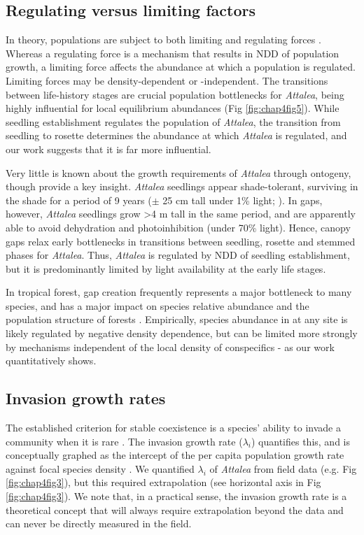 \documentclass[b5paper,justified]{tufte-book} %
\begin{document}
\begin{fullwidth}
\subsection{Regulating versus limiting factors}
In theory, populations are subject to both limiting and regulating forces \citep[e.g.][]{Muller-Landau2016,Turchin1995}. Whereas a regulating force is a mechanism that results in NDD of population growth, a limiting force affects the abundance at which a population is regulated. Limiting forces may be density-dependent or -independent. The transitions between life-history stages are crucial population bottlenecks for \textit{Attalea}, being highly influential for local equilibrium abundances (Fig \ref{fig:chap4fig5}).  While seedling establishment regulates the population of \textit{Attalea}, the transition from seedling to rosette determines the abundance at which \textit{Attalea} is regulated, and our work suggests that it is far more influential.  

Very little is known about the growth requirements of \textit{Attalea} through ontogeny, though \citet{Araus1994} provide a key insight. \textit{Attalea} seedlings appear shade-tolerant, surviving in the shade for a period of 9 years ($\pm$ 25 cm tall under 1\% light; \citealt{Araus1994}). In gaps, however, \textit{Attalea} seedlings grow >4 m tall in the same period, and are apparently able to avoid dehydration and photoinhibition (under 70\% light). Hence, canopy gaps relax early bottlenecks in transitions between seedling, rosette and stemmed phases for \textit{Attalea}.  Thus, \textit{Attalea} is regulated by NDD of seedling establishment, but it is predominantly limited by light availability at the early life stages.
 
In tropical forest, gap creation frequently represents a major bottleneck to many species, and has a major impact on species relative abundance and the population structure of forests \citep{Brokaw1987, Alvarez-Buylla1994, Dalling1998, Farrior2016}.    Empirically, species abundance in at any site is likely regulated by negative density dependence, but can be limited more strongly by mechanisms independent of the local density of conspecifics - as our work quantitatively shows.

\subsection{Invasion growth rates}
The established criterion for stable coexistence is a species' ability to invade a community when it is rare \citep{Adler2010, Siepielski2010}. The invasion growth rate ($\lambda_i$) quantifies this, and is conceptually graphed as the intercept of the per capita population growth rate against focal species density \citep[e.g.][]{Adler2007}.  We quantified $\lambda_i$ of \textit{Attalea} from field data (e.g. Fig \ref{fig:chap4fig3}), but this required extrapolation (see horizontal axis in Fig \ref{fig:chap4fig3}). We note that, in a practical sense, the invasion growth rate is a theoretical concept that will always require extrapolation beyond the data \citep[as in e.g.][]{Adler2010} and can never be directly measured in the field.  


\end{fullwidth}
\end{document}

